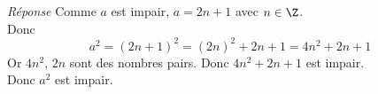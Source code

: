 \textit{Réponse}
Comme $a$ est impair, $a= 2n +1$ avec $n\in \Z$. \\
Donc \[
a^2 = (2n+1)^2 = (2n)^2 + 2n + 1 = 4n^2 + 2n + 1
\]
Or $4n^2$, $2n$ sont des nombres pairs. Donc $4n^2 + 2n + 1$ est impair. \\

Donc $a^2$ est impair.